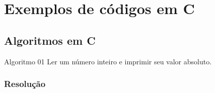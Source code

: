 \section{Exemplos de códigos em C }

\subsection{Algoritmos em C}

\begin{frame}
   \begin{block}{Algoritmo 01}
      Ler um número inteiro e imprimir seu valor absoluto.
   \end{block}
\end{frame}

\begin{frame}
  \frametitle{Resolução}
  \inputminted[linenos,fontsize=\scriptsize]{c}{codes/01-valor-absoluto.c}
\end{frame}

